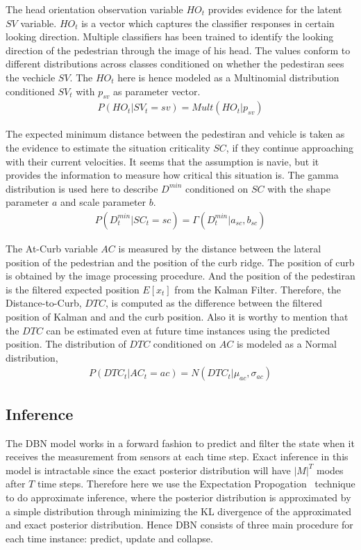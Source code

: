 \documentclass[10pt,twocolumn,letterpaper]{article}
\begin{document}
    The head orientation observation variable $HO_t$ provides evidence for the latent $SV$
    variable. $HO_t$ is a vector which captures the classifier responses in certain 
    looking direction. Multiple classifiers has been trained to identify the looking direction
    of the pedestrian through the image of his head. The values conform to different
    distributions across classes conditioned on whether the pedestiran sees the vechicle $SV$.
    The $HO_t$ here is hence modeled as a Multinomial distribution conditioned $SV_t$ with $p_{sv}$
    as parameter vector.
    \begin{eqnarray*}
        P(HO_t|SV_t = sv) = Mult(HO_t|p_{sv})
    \end{eqnarray*}

    The expected minimum distance between the pedestiran and vehicle is taken as the evidence
    to estimate the situation criticality $SC$, if they continue approaching with their current
    velocities. It seems that the assumption is navie, but it provides the information to
    measure how critical this situation is. The gamma distribution is used here to describe
    $D^{min}$ conditioned on $SC$ with the shape parameter $a$ and scale parameter $b$. 
    \begin{eqnarray*}
        P(D_t^{min}|SC_t=sc) = \Gamma(D_t^{min}|a_{sc}, b_{sc})
    \end{eqnarray*}

    The At-Curb variable $AC$ is measured by the distance between the lateral position of the
    pedestrian and the position of the curb ridge. The position of curb is obtained by the image processing 
    procedure. And the position of the pedestiran is the filtered expected position $E[x_t]$ from the 
    Kalman Filter. Therefore, the Distance-to-Curb, $DTC$, is computed as the difference 
    between the filtered position of Kalman and and the curb position. Also it is worthy to 
    mention that the $DTC$ can be estimated even at future time instances using the predicted 
    position. The distribution of $DTC$ conditioned on $AC$ is modeled as a Normal distribution,
    \begin{eqnarray*}
        P(DTC_t | AC_t = ac) = N(DTC_t|\mu_{ac}, \sigma_{ac})
    \end{eqnarray*}
     

    \subsection{Inference}
    The DBN model works in a forward fashion to predict and filter the state when
    it receives the measurement from sensors at each time step. Exact inference in 
    this model is intractable since the exact posterior distribution will have $|M|^T$
    modes after $T$ time steps. Therefore here we use the Expectation Propogation~\cite{IEEEhowto:minka} technique
    to do approximate inference, where the posterior distribution is approximated by a 
    simple distribution through minimizing the KL divergence of the approximated and
    exact posterior distribution. Hence DBN consists of three main procedure for each 
    time instance: predict, update and collapse. 
\end{document}
